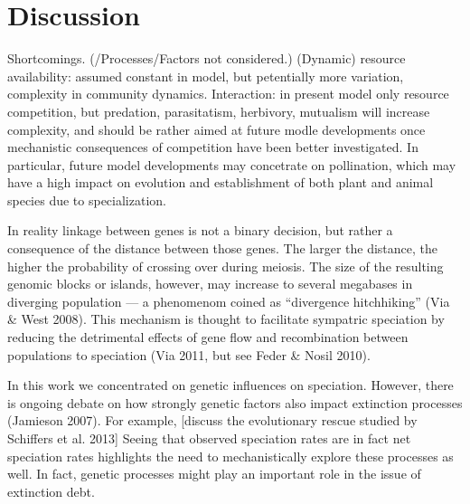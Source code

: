 \documentclass[a4paper]{scrartcl}
\begin{document}
\section{Discussion}
Shortcomings. (/Processes/Factors not considered.)
(Dynamic) resource availability: assumed constant in model, but petentially more variation, complexity in community dynamics.
Interaction: in present model only resource competition, %
but predation, parasitatism, herbivory, mutualism will increase complexity, and should be rather aimed at future modle developments once mechanistic consequences of competition have been better investigated.
In particular, future model developments may concetrate on pollination, which may have a high impact on evolution and establishment of both plant and animal species due to specialization. %

In reality linkage between genes is not a binary decision, but rather a consequence of the distance between those genes.
The larger the distance, the higher the probability of crossing over during meiosis.
The size of the resulting genomic blocks or islands, however, may increase to several megabases in diverging population ---
a phenomenom coined as ``divergence hitchhiking'' (Via \& West 2008). %
This mechanism is thought to facilitate sympatric speciation by reducing the detrimental effects of gene flow and
recombination between populations to speciation (Via 2011, but see Feder \& Nosil 2010).

In this work we concentrated on genetic influences on speciation.
However, there is ongoing debate on how strongly genetic factors also impact extinction processes (Jamieson 2007). For example, [discuss the evolutionary rescue studied by Schiffers et al. 2013]
Seeing that observed speciation rates are in fact net speciation rates highlights the need to mechanistically explore
these processes as well.
In fact, genetic processes might play an important role in the issue of extinction debt. %

\printbibliography
\end{document}
